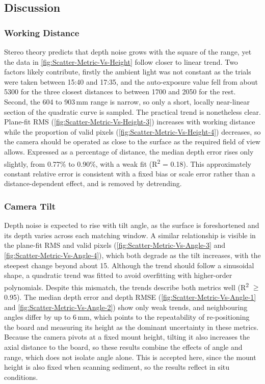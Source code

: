 \subsection{Discussion}\label{ch6:sec:discusion}

\subsubsection{Working Distance}
Stereo theory predicts that depth noise grows with the square of the range, yet the data in \autoref{fig:Scatter-Metric-Vs-Height} follow closer to linear trend. Two factors likely contribute, firstly the ambient light was not constant as the trials were taken between 15:40 and 17:35, and the auto-exposure value fell from about 5300 for the three closest distances to between 1700 and 2050 for the rest. Second, the 604 to 903\,mm range is narrow, so only a short, locally near-linear section of the quadratic curve is sampled. The practical trend is nonetheless clear. Plane-fit RMS (\autoref{fig:Scatter-Metric-Vs-Height-3}) increases with working distance while the proportion of valid pixels (\autoref{fig:Scatter-Metric-Vs-Height-4}) decreases, so the camera should be operated as close to the surface as the required field of view allows. Expressed as a percentage of distance, the median depth error rises only slightly, from 0.77\% to 0.90\%, with a weak fit (R\textsuperscript{2} = 0.18). This approximately constant relative error is consistent with a fixed bias or scale error rather than a distance-dependent effect, and is removed by detrending.

\subsubsection{Camera Tilt}

Depth noise is expected to rise with tilt angle, as the surface is foreshortened and its depth varies across each matching window. A similar relationship is visible in the plane-fit RMS and valid pixels (\autoref{fig:Scatter-Metric-Vs-Angle-3} and \autoref{fig:Scatter-Metric-Vs-Angle-4}), which both degrade as the tilt increases, with the steepest change beyond about 15\degree. Although the trend should follow a sinusoidal shape, a quadratic trend was fitted to avoid overfitting with higher-order polynomials. Despite this mismatch, the trends describe both metrics well (R\textsuperscript{2} $\geq$ 0.95). The median depth error and depth RMSE (\autoref{fig:Scatter-Metric-Vs-Angle-1} and \autoref{fig:Scatter-Metric-Vs-Angle-2}) show only weak trends, and neighbouring angles differ by up to 6\,mm, which points to the repeatability of re-positioning the board and measuring its height as the dominant uncertainty in these metrics. Because the camera pivots at a fixed mount height, tilting it also increases the axial distance to the board, so these results combine the effects of angle and range, which does not isolate angle alone. This is accepted here, since the mount height is also fixed when scanning sediment, so the results reflect in situ conditions.

